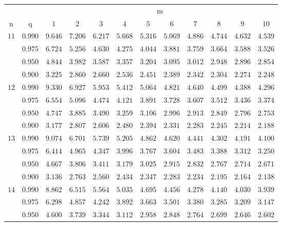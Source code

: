 \documentclass[11pt]{article}
\theoremstyle{definition}
\begin{document}
\begin{table}[H]
	\begin{tabularx}{\linewidth}{c | c | c c c c c c c c c c}
		& & \multicolumn{10}{c}{m}\\
		\cline{3-12}
		n & q & $1$ & $2$ & $3$ & $4$ & $5$ & $6$ & $7$ & $8$ & $9$ & $10$\\
		\hline
		$11$ & $0.990$ & $9.646$ & $7.206$ & $6.217$ & $5.668$ & $5.316$ & $5.069$ & $4.886$ & $4.744$ & $4.632$ & $4.539$ \\
		& $0.975$ & $6.724$ & $5.256$ & $4.630$ & $4.275$ & $4.044$ & $3.881$ & $3.759$ & $3.664$ & $3.588$ & $3.526$ \\
		& $0.950$ & $4.844$ & $3.982$ & $3.587$ & $3.357$ & $3.204$ & $3.095$ & $3.012$ & $2.948$ & $2.896$ & $2.854$ \\
		& $0.900$ & $3.225$ & $2.860$ & $2.660$ & $2.536$ & $2.451$ & $2.389$ & $2.342$ & $2.304$ & $2.274$ & $2.248$ \\
		$12$ & $0.990$ & $9.330$ & $6.927$ & $5.953$ & $5.412$ & $5.064$ & $4.821$ & $4.640$ & $4.499$ & $4.388$ & $4.296$ \\
		& $0.975$ & $6.554$ & $5.096$ & $4.474$ & $4.121$ & $3.891$ & $3.728$ & $3.607$ & $3.512$ & $3.436$ & $3.374$ \\
		& $0.950$ & $4.747$ & $3.885$ & $3.490$ & $3.259$ & $3.106$ & $2.996$ & $2.913$ & $2.849$ & $2.796$ & $2.753$ \\
		& $0.900$ & $3.177$ & $2.807$ & $2.606$ & $2.480$ & $2.394$ & $2.331$ & $2.283$ & $2.245$ & $2.214$ & $2.188$ \\
		$13$ & $0.990$ & $9.074$ & $6.701$ & $5.739$ & $5.205$ & $4.862$ & $4.620$ & $4.441$ & $4.302$ & $4.191$ & $4.100$ \\
		& $0.975$ & $6.414$ & $4.965$ & $4.347$ & $3.996$ & $3.767$ & $3.604$ & $3.483$ & $3.388$ & $3.312$ & $3.250$ \\
		& $0.950$ & $4.667$ & $3.806$ & $3.411$ & $3.179$ & $3.025$ & $2.915$ & $2.832$ & $2.767$ & $2.714$ & $2.671$ \\
		& $0.900$ & $3.136$ & $2.763$ & $2.560$ & $2.434$ & $2.347$ & $2.283$ & $2.234$ & $2.195$ & $2.164$ & $2.138$ \\
		$14$ & $0.990$ & $8.862$ & $6.515$ & $5.564$ & $5.035$ & $4.695$ & $4.456$ & $4.278$ & $4.140$ & $4.030$ & $3.939$ \\
		& $0.975$ & $6.298$ & $4.857$ & $4.242$ & $3.892$ & $3.663$ & $3.501$ & $3.380$ & $3.285$ & $3.209$ & $3.147$ \\
		& $0.950$ & $4.600$ & $3.739$ & $3.344$ & $3.112$ & $2.958$ & $2.848$ & $2.764$ & $2.699$ & $2.646$ & $2.602$ \\

\end{tabularx}
\end{table}
\end{document}
